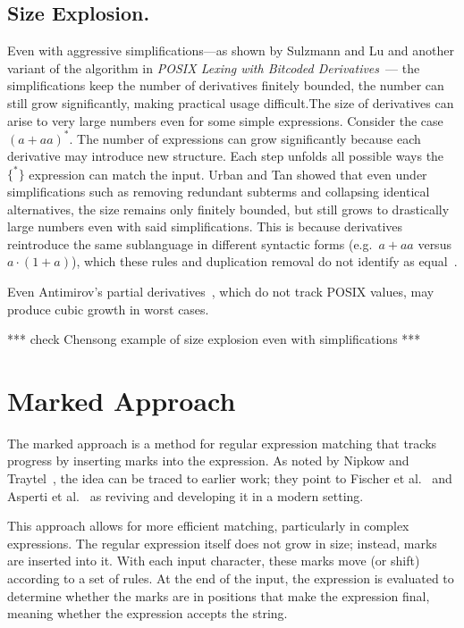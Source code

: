 \documentclass[12pt]{article}
\begin{document}
\subsection{Size Explosion.} %

Even with aggressive simplifications—as shown by Sulzmann and Lu and another variant of the algorithm in \emph{POSIX Lexing 
with Bitcoded Derivatives}~\cite{TanAndUrban2023}— the simplifications keep the number of derivatives finitely bounded, the
number can still grow significantly, making practical usage difficult.The size of derivatives can arise to very large numbers
even for some simple expressions. Consider the case $ (a + aa)^*$. The number of expressions can grow significantly because each 
derivative may introduce new structure. Each step  unfolds all possible ways the $\{^*\}$ expression can match the input. Urban
and Tan showed that even under simplifications such as removing redundant subterms and collapsing identical alternatives, the size
remains only finitely bounded, but still grows to drastically large numbers even with said simplifications. This is because 
derivatives reintroduce the same sublanguage in different syntactic forms (e.g.\ $a+aa$ versus $a\cdot(1+a)$), which these rules 
and duplication removal do not identify as equal~\cite{TanAndUrban2023}.

Even Antimirov’s partial derivatives~\cite{Antimirov1996}, which do not track POSIX values, may produce cubic growth in worst
cases.~\cite{Antimirov1996}

*** check Chensong example of size explosion even with simplifications ***

\section{Marked Approach}

The marked approach is a method for regular expression matching that tracks progress by inserting marks into the expression. 
As noted by Nipkow and Traytel~\cite{NipkowTraytel2014}, the idea can be traced to earlier work; 
they point to Fischer et al.~\cite{Fischer2010} and Asperti et al.~\cite{Asperti2010} as reviving and developing it in a modern setting.

This approach allows for more efficient matching, particularly in complex expressions. The regular expression
itself does not grow in size; instead, marks are inserted into it. With each input character, these marks move (or shift) according
to a set of rules. At the end of the input, the expression is evaluated to determine whether the marks are in positions that make the
expression final, meaning whether the expression accepts the string.
 
\end{document}
